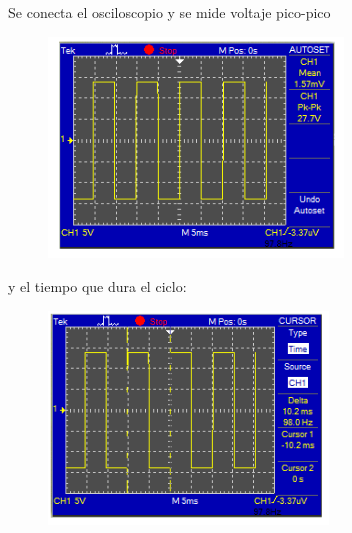 \documentclass[12pt]{article}
\begin{document}

\par


\vspace{\baselineskip}
\begin{Center}
\textcolor[HTML]{656565}{Se conecta el osciloscopio y se mide voltaje pico-pico}
\end{Center}\par




\begin{figure}[H]
	\begin{Center}
		\includegraphics[width=3.09in,height=2.31in]{./media/image5.png}
	\end{Center}
\end{figure}



\par
\newpage
\begin{Center}
\textcolor[HTML]{656565}{y el tiempo que dura el ciclo:}
\end{Center}\par




\begin{figure}[H]
	\begin{Center}
		\includegraphics[width=2.93in,height=2.23in]{./media/image6.png}
	\end{Center}
\end{figure}
\end{document}
